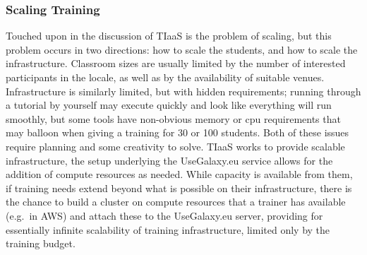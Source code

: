 \documentclass[10pt,letterpaper]{article}
\begin{document}
\subsubsection*{Scaling Training}
Touched upon in the discussion of TIaaS is the problem of scaling, but this problem occurs in two directions: how to scale the students, and how to scale the infrastructure.
Classroom sizes are usually limited by the number of interested participants in the locale, as well as by the availability of suitable venues.
Infrastructure is similarly limited, but with hidden requirements; running through a tutorial by yourself may execute quickly and look like everything will run smoothly, but some tools have non-obvious memory or cpu requirements that may balloon when giving a training for 30 or 100 students.
Both of these issues require planning and some creativity to solve.
TIaaS works to provide scalable infrastructure, the setup underlying the UseGalaxy.eu service allows for the addition of compute resources as needed.
While capacity is available from them, if training needs extend beyond what is possible on their infrastructure, there is the chance to build a cluster on compute resources that a trainer has available (e.g.\ in AWS) and attach these to the UseGalaxy.eu server, providing for essentially infinite scalability of training infrastructure, limited only by the training budget.
\end{document}
